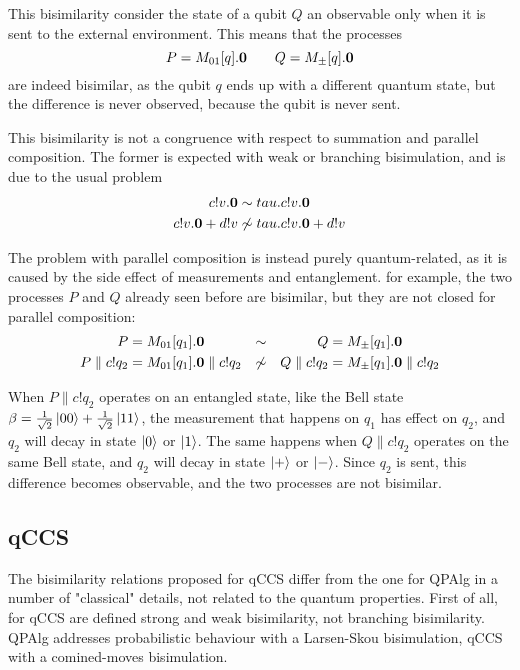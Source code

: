 This bisimilarity consider the state of a qubit $Q$ an observable only when it is sent to the external environment. This means that the processes 
\[ P = M_{01}[q].\mathbf{0} \qquad Q = M_\pm[q].\mathbf{0}\]
are indeed bisimilar, as the qubit $q$ ends up with a different quantum state, but the difference is never observed, because the qubit is never sent.

This bisimilarity is not a congruence with respect to summation and parallel composition. The former is expected with weak or branching bisimulation, and is due to the usual problem 
\begin{align*}
c!v.\mathbf{0} &\sim tau.c!v.\mathbf{0} \\
c!v.\mathbf{0} + d!v &\not\sim tau.c!v.\mathbf{0} + d!v
\end{align*}

The problem with parallel composition is instead purely quantum-related, as it is caused by the side effect of measurements and entanglement. for example, the two processes $P$ and $Q$ already seen before are bisimilar, but they are not closed for parallel composition:
\begin{align*}
 P &= M_{01}[q_1].\mathbf{0} &\sim & & Q &= M_\pm[q_1].\mathbf{0} \\ 
 P \parallel c!q_2 &=  M_{01}[q_1].\mathbf{0} \parallel c!q_2 &\not\sim & & Q \parallel c!q_2 &=  M_\pm[q_1].\mathbf{0} \parallel c!q_2 
\end{align*} 

When $P\parallel c!q_2$ operates on an entangled state, like the Bell state $\beta = \frac{1}{\sqrt{2}}\ket{00} + \frac{1}{\sqrt{2}}\ket{11}$, the measurement that happens on $q_1$ has effect on $q_2$, and $q_2$ will decay in state $\ket{0}$ or $\ket{1}$. The same happens when $Q\parallel c!q_2$ operates on the same Bell state, and $q_2$ will decay in state $\ket{+}$ or $\ket{-}$. Since $q_2$ is sent, this difference becomes observable, and the two processes are not bisimilar.

\subsection{qCCS}

The bisimilarity relations proposed for qCCS differ from the one for QPAlg in a number of "classical" details, not related to the quantum properties. First of all, for qCCS are defined strong and weak bisimilarity, not branching bisimilarity. QPAlg addresses probabilistic behaviour with a Larsen-Skou bisimulation, qCCS with a comined-moves bisimulation. 

